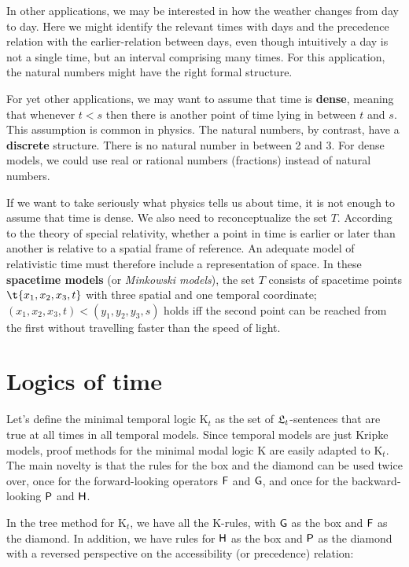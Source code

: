 In other applications, we may be interested in how the weather changes from day
to day. Here we might identify the relevant times with days and the precedence
relation with the earlier-relation between days, even though intuitively a day
is not a single time, but an interval comprising many times. For this
application, the natural numbers might have the right formal structure.

For yet other applications, we may want to assume that time is \textbf{dense},
meaning that whenever $t < s$ then there is another point of time lying in
between $t$ and $s$. This assumption is common in physics. The natural numbers,
by contrast, have a \textbf{discrete} structure. There is no natural number in
between 2 and 3. For dense models, we could use real or rational numbers
(fractions) instead of natural numbers.


If we want to take seriously what physics tells us about time, it is not enough
to assume that time is dense. We also need to reconceptualize the set $T$.
According to the theory of special relativity, whether a point in time is
earlier or later than another is relative to a spatial frame of reference. An
adequate model of relativistic time must therefore include a representation of
space. In these \textbf{spacetime models} (or \emph{Minkowski models}), the set
$T$ consists of spacetime points $\t{x_1,x_2,x_3,t}$ with three spatial and one
temporal coordinate; $(x_1,x_2,x_3,t) < (y_1,y_2,y_3,s)$ holds iff the second
point can be reached from the first without travelling faster than the speed of
light.

\section{Logics of time}

Let's define the minimal temporal logic K$_t$ as the set of $\mathfrak{L}_{t}$-sentences
that are true at all times in all temporal models. Since temporal models are
just Kripke models, proof methods for the minimal modal logic K are easily
adapted to K$_{t}$. The main novelty is that the rules for the box and the
diamond can be used twice over, once for the forward-looking operators $\operatorname{\mathsf{F}}$ and
$\operatorname{\mathsf{G}}$, and once for the backward-looking $\operatorname{\mathsf{P}}$ and $\operatorname{\mathsf{H}}$.

In the tree method for K$_{t}$, we have all the K-rules, with $\operatorname{\mathsf{G}}$ as the box
and $\operatorname{\mathsf{F}}$ as the diamond. In addition, we have rules for $\operatorname{\mathsf{H}}$ as the box and
$\operatorname{\mathsf{P}}$ as the diamond with a reversed perspective on the accessibility (or
precedence) relation:


